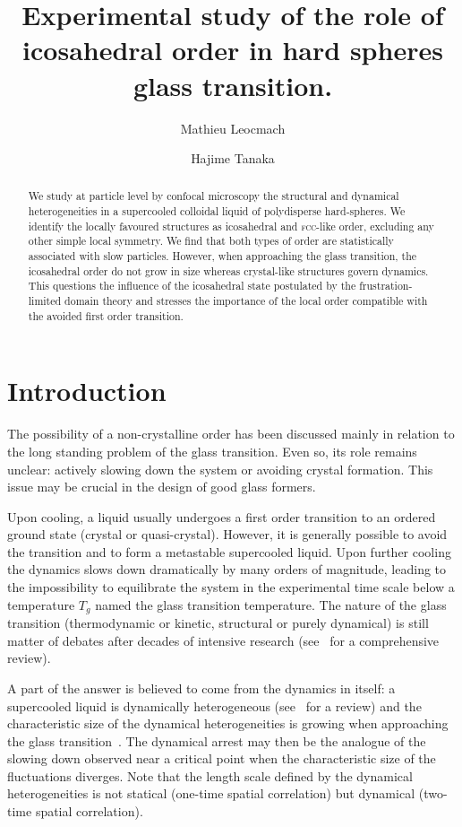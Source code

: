 \documentclass{revtex4-1}
\begin{document}
\title{Experimental study of the role of icosahedral order in hard spheres glass transition.}

\author{Mathieu Leocmach}
\author{Hajime Tanaka}

\begin{abstract}
We study at particle level by confocal microscopy the structural and dynamical heterogeneities in a supercooled colloidal liquid of polydisperse hard-spheres. We identify the locally favoured structures as icosahedral and \textsc{fcc}-like order, excluding any other simple local symmetry. We find that both types of order are statistically associated with slow particles. However, when approaching the glass transition, the icosahedral order do not grow in size whereas crystal-like structures govern dynamics. This questions the influence of the icosahedral state postulated by the frustration-limited domain theory and stresses the importance of the local order compatible with the avoided first order transition.
\end{abstract}

\maketitle

\section*{Introduction}

The possibility of a non-crystalline order has been discussed mainly in relation to the long standing problem of the glass transition. Even so, its role remains unclear: actively slowing down the system or avoiding crystal formation. This issue may be crucial in the design of good glass formers.

Upon cooling, a liquid usually undergoes a first order transition to an ordered ground state (crystal or quasi-crystal). However, it is generally possible to avoid the transition and to form a metastable supercooled liquid. Upon further cooling the dynamics slows down dramatically by many orders of magnitude, leading to the impossibility to equilibrate the system in the experimental time scale below a temperature $T_g$ named the glass transition temperature. The nature of the glass transition (thermodynamic or kinetic, structural or purely dynamical) is still matter of debates after decades of intensive research (see~\citep{cavagna2009supercooled} for a comprehensive review).

A part of the answer is believed to come from the dynamics in itself: a supercooled liquid is dynamically heterogeneous (see~\citep{Berthier2011} for a review) and the characteristic size of the dynamical heterogeneities is growing when approaching the glass transition~\citep{Donati1999, Berthier2005}. The dynamical arrest may then be the analogue of the slowing down observed near a critical point when the characteristic size of the fluctuations diverges. Note that the length scale defined by the dynamical heterogeneities is not statical (one-time spatial correlation) but dynamical (two-time spatial correlation). 
\end{document}
